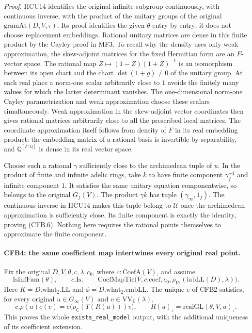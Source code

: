 \emph{Proof.}
HCU14 identifies the original infinite subgroup continuously, with
continuous inverse, with the product of the unitary groups of the
original \(\mathrm{gramAt}(D,V,\tau)\).  Its proof identifies the
given \(\theta\) entry by entry; it does not choose replacement
embeddings.  Rational unitary matrices are dense in this finite
product by the Cayley proof in MF3.  To recall why the density uses
only weak approximation, the skew-adjoint matrices for the fixed
Hermitian form are an \(F\)-vector space.  The rational map
\(Z\mapsto(1-Z)(1+Z)^{-1}\) is an isomorphism between its open
chart and the chart \(\det(1+g)\ne0\) of the unitary group.
At each real place a norm-one scalar arbitrarily close to \(1\)
avoids the finitely many values for which the latter determinant
vanishes.  The one-dimensional norm-one Cayley parametrization and
weak approximation choose these scalars simultaneously.  Weak
approximation in the skew-adjoint vector coordinates then gives
rational matrices arbitrarily close to all the prescribed local
matrices.  The coordinate approximation itself follows from density
of \(F\) in its real embedding product: the embedding matrix of a
rational basis is invertible by separability, and
\(\mathbb Q^{[F:\mathbb Q]}\) is dense in its real vector space.

Choose such a rational \(\gamma\) sufficiently close to the
archimedean tuple of \(u\).  In the product of finite and infinite
adelic rings, take \(k\) to have finite component
\(\gamma_f^{-1}\) and infinite component \(1\).  It satisfies
the same unitary equation componentwise, so belongs to the original
\(G_f(V)\).  The product \(\gamma k\) has tuple
\((\gamma_\infty,1_f)\).  The continuous inverse in HCU14 makes
this tuple belong to \(\mathcal U\) once the archimedean
approximation is sufficiently close.  Its finite component is
exactly the identity, proving (CFB.6).  Nothing here requires the
rational points themselves to approximate the finite component.

\paragraph{CFB4: the same coefficient map intertwines every original real point.}
\label{claim:CFB4}
Fix the original \(D,V,\theta,c,\lambda,c_0\), where
\(c:\mathrm{CoefA}(V)\), and assume
\[
 \mathrm{IsInfFam}(\theta),\qquad c.\mathrm{Is},\qquad
 \mathrm{CoefMapTie}\bigl(V,c.\mathrm{coef},c_0,
                  \rho_{Vr}(\mathrm{labLL}(D),\lambda)\bigr).
                                                               \tag{CFB.7}
\]
Here \(K=D.\mathrm{what}_2.\mathrm{LL}\) and
\(\phi=D.\mathrm{what}_2.\mathrm{embLL}\).
The unique \(e\) of CFB2 satisfies, for every original
\(u\in G_\infty(V)\) and \(v\in\mathrm{VV}_{\mathbb C}(\lambda)\),
\[
       c.\rho(u)e(v)
       =e\bigl(\rho_{\mathbb C}(T(R(u)))v\bigr),\qquad
 R(u)_\tau=\mathrm{realGL}(\theta,V,u)_\tau.
                                                               \tag{CFB.8}
\]
This proves the whole \texttt{exists\_real\_model} output, with
the additional uniqueness of its coefficient extension.

